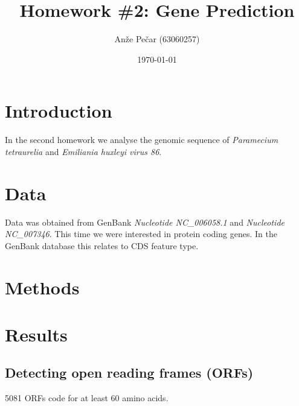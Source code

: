 \documentclass[a4paper,11pt]{article}
\title{Homework \#2: Gene Prediction}
\author{Anže Pečar (63060257)}
\date{\today}
\begin{document}
\maketitle

\section{Introduction}

In the second homework we analyse the genomic sequence of \textit{Paramecium tetraurelia} and \textit{Emiliania huxleyi virus 86}.

\section{Data}

Data was obtained from GenBank \textit{Nucleotide NC\_006058.1} and \textit{Nucleotide NC\_007346}. This time we were interested in protein coding genes. In the GenBank database this relates to CDS feature type.

\section{Methods}

\section{Results}

\subsection{Detecting open reading frames (ORFs)}

5081 ORFs code for at least 60 amino acids.
\end{document}
